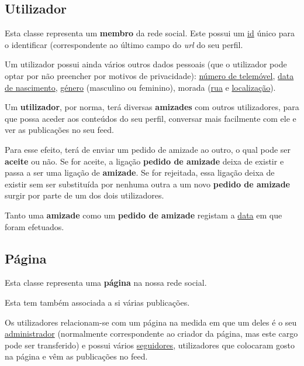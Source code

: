\documentclass[12pt]{report}
\begin{document}
\subsection{Utilizador}

Esta classe representa um \textbf{membro} da rede social. Este possui um \underline{id} único para o identificar (correspondente ao último campo do \textit{url} do seu perfil. \par

Um utilizador possui ainda vários outros dados pessoais (que o utilizador pode optar por não preencher por motivos de privacidade): \underline{número de telemóvel}, \underline{data de nascimento}, \underline{género} (masculino ou feminino), morada (\underline{rua} e \underline{localização}). \par

Um \textbf{utilizador}, por norma, terá diversas \textbf{amizades} com outros utilizadores, para que possa aceder aos conteúdos do seu perfil, conversar mais facilmente com ele e ver as publicações no seu feed.\par

Para esse efeito, terá de enviar um pedido de amizade ao outro, o qual pode ser \textbf{aceite} ou não. Se for aceite, a ligação \textbf{pedido de amizade} deixa de existir e passa a ser uma ligação de \textbf{amizade}. Se for rejeitada, essa ligação deixa de existir sem ser substituída por nenhuma outra a um novo \textbf{pedido de amizade} surgir por parte de um dos dois utilizadores.

Tanto uma \textbf{amizade} como um \textbf{pedido de amizade} registam a \underline{data} em que foram efetuados.

\subsection{Página}

Esta classe representa uma \textbf{página} na nossa rede social. \par

Esta tem também associada a si várias publicações. \par

Os utilizadores relacionam-se com um página na medida em que um deles é o seu \underline{administrador} (normalmente correspondente ao criador da página, mas este cargo pode ser transferido) e possui vários \underline{seguidores}, utilizadores que colocaram gosto na página e vêm as publicações no feed.
\end{document}
